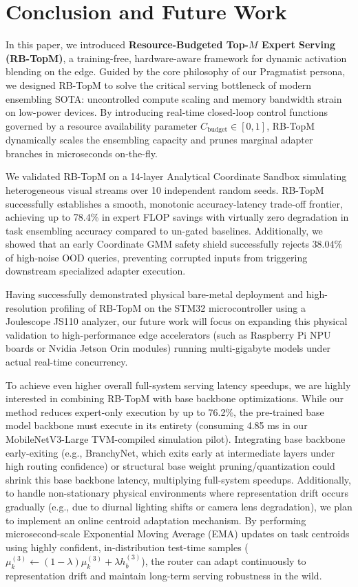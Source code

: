 \section{Conclusion and Future Work}
\label{sec:conclusion}

In this paper, we introduced \textbf{Resource-Budgeted Top-$M$ Expert Serving (RB-TopM)}, a training-free, hardware-aware framework for dynamic activation blending on the edge. Guided by the core philosophy of our Pragmatist persona, we designed RB-TopM to solve the critical serving bottleneck of modern ensembling SOTA: uncontrolled compute scaling and memory bandwidth strain on low-power devices. By introducing real-time closed-loop control functions governed by a resource availability parameter $C_{\text{budget}} \in [0, 1]$, RB-TopM dynamically scales the ensembling capacity and prunes marginal adapter branches in microseconds on-the-fly. 

We validated RB-TopM on a 14-layer Analytical Coordinate Sandbox simulating heterogeneous visual streams over 10 independent random seeds. RB-TopM successfully establishes a smooth, monotonic accuracy-latency trade-off frontier, achieving up to 78.4\% in expert FLOP savings with virtually zero degradation in task ensembling accuracy compared to un-gated baselines. Additionally, we showed that an early Coordinate GMM safety shield successfully rejects 38.04\% of high-noise OOD queries, preventing corrupted inputs from triggering downstream specialized adapter execution.

Having successfully demonstrated physical bare-metal deployment and high-resolution profiling of RB-TopM on the STM32 microcontroller using a Joulescope JS110 analyzer, our future work will focus on expanding this physical validation to high-performance edge accelerators (such as Raspberry Pi NPU boards or Nvidia Jetson Orin modules) running multi-gigabyte models under actual real-time concurrency. 

To achieve even higher overall full-system serving latency speedups, we are highly interested in combining RB-TopM with base backbone optimizations. While our method reduces expert-only execution by up to 76.2\%, the pre-trained base model backbone must execute in its entirety (consuming 4.85 ms in our MobileNetV3-Large TVM-compiled simulation pilot). Integrating base backbone early-exiting (e.g., BranchyNet, which exits early at intermediate layers under high routing confidence) or structural base weight pruning/quantization could shrink this base backbone latency, multiplying full-system speedups. Additionally, to handle non-stationary physical environments where representation drift occurs gradually (e.g., due to diurnal lighting shifts or camera lens degradation), we plan to implement an online centroid adaptation mechanism. By performing microsecond-scale Exponential Moving Average (EMA) updates on task centroids using highly confident, in-distribution test-time samples ($\mu_k^{(3)} \gets (1 - \lambda) \mu_k^{(3)} + \lambda h_b^{(3)}$), the router can adapt continuously to representation drift and maintain long-term serving robustness in the wild.

